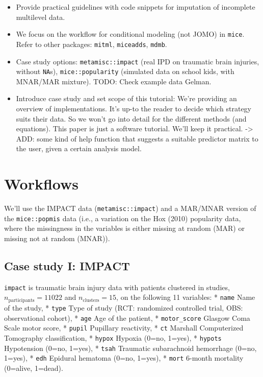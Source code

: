 \documentclass[
]{jss}
\begin{document}
\begin{itemize}
\item
  Provide practical guidelines with code snippets for imputation of
  incomplete multilevel data.
\item
  We focus on the workflow for conditional modeling (not JOMO) in
  \texttt{mice}. Refer to other packages: \texttt{mitml},
  \texttt{miceadds}, \texttt{mdmb}.
\item
  Case study options: \texttt{metamisc::impact} (real IPD on traumatic
  brain injuries, without \texttt{NA}s), \texttt{mice::popularity}
  (simulated data on school kids, with MNAR/MAR mixture). TODO: Check
  example data Gelman.
\item
  Introduce case study and set scope of this tutorial: We're providing
  an overview of implementations. It's up-to the reader to decide which
  strategy suits their data. So we won't go into detail for the
  different methods (and equations). This paper is just a software
  tutorial. We'll keep it practical. -\textgreater{} ADD: some kind of
  help function that suggests a suitable predictor matrix to the user,
  given a certain analysis model.
\end{itemize}

\hypertarget{workflows}{%
\section{Workflows}\label{workflows}}

We'll use the IMPACT data (\texttt{metamisc::impact}) and a MAR/MNAR
version of the \texttt{mice::popmis} data (i.e., a variation on the Hox
(2010) popularity data, where the missingness in the variables is either
missing at random (MAR) or missing not at random (MNAR)).

\hypertarget{case-study-i-impact}{%
\subsection{Case study I: IMPACT}\label{case-study-i-impact}}

\texttt{impact} is traumatic brain injury data with patients clustered
in studies, \(n_{\text{participants}} = 11022\) and
\(n_{\text{clusters}} = 15\), on the following 11 variables: *
\texttt{name} Name of the study, * \texttt{type} Type of study (RCT:
randomized controlled trial, OBS: observational cohort), * \texttt{age}
Age of the patient, * \texttt{motor\_score} Glasgow Coma Scale motor
score, * \texttt{pupil} Pupillary reactivity, * \texttt{ct} Marshall
Computerized Tomography classification, * \texttt{hypox} Hypoxia (0=no,
1=yes), * \texttt{hypots} Hypotension (0=no, 1=yes), * \texttt{tsah}
Traumatic subarachnoid hemorrhage (0=no, 1=yes), * \texttt{edh} Epidural
hematoma (0=no, 1=yes), * \texttt{mort} 6-month mortality (0=alive,
1=dead).
\end{document}

